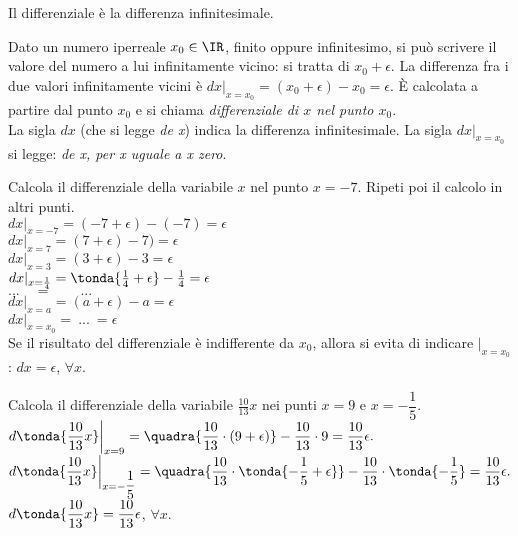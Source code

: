 \begin{definizione}
 Il differenziale è la differenza infinitesimale.
\end{definizione}

Dato un numero iperreale $x_0\in\IR$, finito oppure infinitesimo, si può 
scrivere il valore del numero a lui infinitamente vicino: si tratta di 
$x_0+\epsilon$. La differenza fra i due valori infinitamente vicini è 
$dx|_{x=x_0}=(x_0+\epsilon)-x_0=\epsilon$.
È calcolata a partire dal punto $x_0$ e si chiama \emph{differenziale di $x$ 
nel punto $x_0$}.\\
La sigla $dx$ (che si legge \emph{de x}) indica la differenza infinitesimale.
La sigla $dx|_{x=x_0}$ si legge: \emph{de x, per x uguale a x zero}. 

\begin{esempio}
 Calcola il differenziale della variabile $x$ nel punto $x=-7$. Ripeti poi il 
 calcolo in altri punti.\\
  $dx|_{x=-7} =(-7+\epsilon)-(-7)=\epsilon$\\
  $dx|_{x=7} =(7+\epsilon)-7)=\epsilon$\\
  $dx|_{x=3} =(3+\epsilon)-3=\epsilon$\\
  $dx|_{x=\frac{1}{4}} = \tonda{\frac{1}{4}+\epsilon}-\frac{1}{4}=\epsilon$\\
  $...\quad = \qquad ...$\\
  $dx|_{x=a}  =(a+\epsilon)-a=\epsilon$\\
  $dx|_{x=x_0}  =\ ...\ =\epsilon$\\
  Se il risultato del differenziale è indifferente da $x_0$, allora si evita 
di 
  indicare $|_{x=x_0}$: $dx=\epsilon$, $\forall x$. 
\end{esempio}

\begin{esempio}
 Calcola il differenziale della variabile $\frac{10}{13}x$ nei punti $x=9$ e 
 $x=-\dfrac{1}{5}$.\\
 
$d\tonda{\dfrac{10}{13}x}\bigg|_{x=9}=\quadra{\dfrac{10}{13}\cdot(9+\epsilon)}-
  \dfrac{10}{13}\cdot 9 = \dfrac{10}{13}\epsilon.$\\
 
$d\tonda{\dfrac{10}{13}x}\bigg|_{x=-\dfrac{1}{5}}=\quadra{\dfrac{10}{13}\cdot
  \tonda{-\dfrac{1}{5}+\epsilon}}-
 \dfrac{10}{13}\cdot \tonda{-\dfrac{1}{5}}= \dfrac{10}{13}\epsilon.$\\
 $d\tonda{\dfrac{10}{13}x}=\dfrac{10}{13}\epsilon$, $\forall x$.
 \end{esempio}

